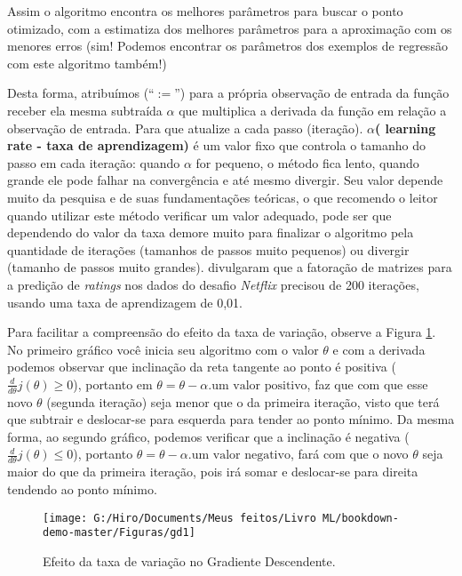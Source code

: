 \documentclass[
]{book}
\begin{document}
Assim o algoritmo encontra os melhores parâmetros para buscar o ponto otimizado, com a estimatiza dos melhores parâmetros para a aproximação com os menores erros (sim! Podemos encontrar os parâmetros dos exemplos de regressão com este algoritmo também!)

Desta forma, atribuímos (``\(:=\)'') para a própria observação de entrada da função receber ela mesma subtraída \(\alpha\) que multiplica a derivada da função em relação a observação de entrada. Para que atualize a cada passo (iteração). \textbf{\(\alpha\)( learning rate - taxa de aprendizagem)} é um valor fixo que controla o tamanho do passo em cada iteração: quando \(\alpha\) for pequeno, o método fica lento, quando grande ele pode falhar na convergência e até mesmo divergir. Seu valor depende muito da pesquisa e de suas fundamentações teóricas, o que recomendo o leitor quando utilizar este método verificar um valor adequado, pode ser que dependendo do valor da taxa demore muito para finalizar o algoritmo pela quantidade de iterações (tamanhos de passos muito pequenos) ou divergir (tamanho de passos muito grandes). \citet{rendle2008online} divulgaram que a fatoração de matrizes para a predição de \emph{ratings} nos dados do desafio \emph{Netflix} precisou de 200 iterações, usando uma taxa de aprendizagem de 0,01.

Para facilitar a compreensão do efeito da taxa de variação, observe a Figura \ref{fig:gd1}. No primeiro gráfico você inicia seu algoritmo com o valor \(\theta\) e com a derivada podemos observar que inclinação da reta tangente ao ponto é positiva (\(\frac{d}{d\theta}j(\theta)\geq 0\)), portanto em \(\theta=\theta-\alpha.\mbox{um valor positivo}\), faz que com que esse novo \(\theta\) (segunda iteração) seja menor que o da primeira iteração, visto que terá que subtrair e deslocar-se para esquerda para tender ao ponto mínimo. Da mesma forma, ao segundo gráfico, podemos verificar que a inclinação é negativa (\(\frac{d}{d\theta}j(\theta)\leq 0\)), portanto \(\theta=\theta-\alpha.\mbox{um valor negativo}\), fará com que o novo \(\theta\) seja maior do que da primeira iteração, pois irá somar e deslocar-se para direita tendendo ao ponto mínimo.

\begin{figure}

{\centering \texttt{[image: G:/Hiro/Documents/Meus feitos/Livro ML/bookdown-demo-master/Figuras/gd1]} 

}

\caption{Efeito da taxa de variação no Gradiente Descendente.}\label{fig:gd1}
\end{figure}
\end{document}
